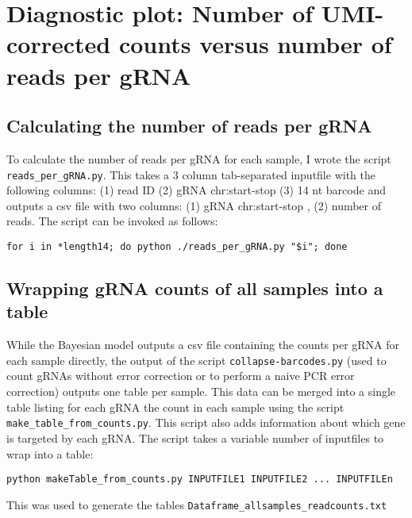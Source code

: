 \section{Diagnostic plot: Number of UMI-corrected counts versus number of reads per gRNA}
\label{subsec:Diagnostic_plot Counts vs reads}

\subsection{Calculating the number of reads per gRNA}

To calculate the number of reads per gRNA for each sample, I wrote the script \verb|reads_per_gRNA.py|. This takes a 3 column tab-separated inputfile with the following columns: (1) read ID (2) gRNA chr:start-stop (3) 14 nt barcode and outputs a csv file with two columns: (1) gRNA chr:start-stop , (2) number of reads. The script can be invoked as follows:

\begin{small}\begin{lstlisting}
for i in *length14; do python ./reads_per_gRNA.py "$i"; done
\end{lstlisting}\end{small}

\subsection{Wrapping gRNA counts of all samples into a table}

While the Bayesian model outputs a csv file containing the counts per gRNA for each sample directly, the output of the script \verb|collapse-barcodes.py| (used to count gRNAs without error correction or to perform a naive PCR error correction) outputs one table per sample. This data can be merged into a single table listing for each gRNA the count in each sample using the script \verb|make_table_from_counts.py|. This script also adds information about which gene is targeted by each gRNA. The script takes a variable number of inputfiles to wrap into a table:

\begin{small}\begin{lstlisting}
python makeTable_from_counts.py INPUTFILE1 INPUTFILE2 ... INPUTFILEn
\end{lstlisting}\end{small}

This was used to generate the tables \verb|Dataframe_allsamples_readcounts.txt|  \verb||  \verb|| 

